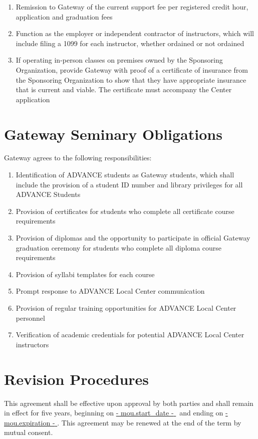 \documentclass{article}
\newcommand{\agreementstartdate}{ {{- mou.start_date -}} }
\newcommand{\agreementenddate}{ {{- mou.expiration -}} }
\begin{document}
\begin{enumerate}
    \item Remission to Gateway of the current support fee per registered credit hour, application and graduation fees
    \item Function as the employer or independent contractor of instructors, which will include filing a 1099 for each instructor, whether ordained or not ordained
    \item If operating in-person classes on premises owned by the Sponsoring Organization, provide Gateway with proof of a certificate of insurance from the Sponsoring Organization to show that they have appropriate insurance that is current and viable. The certificate must accompany the Center application
\end{enumerate}

\section*{\textbf{Gateway Seminary Obligations}}
Gateway agrees to the following responsibilities:
\begin{enumerate} \singlespacing
    \item Identification of ADVANCE students as Gateway students, which shall include the provision of a student ID number and library privileges for all ADVANCE Students
    \item Provision of certificates for students who complete all certificate course requirements
    \item Provision of diplomas and the opportunity to participate in official Gateway graduation ceremony for students who complete all diploma course requirements
    \item Provision of syllabi templates for each course
    \item Prompt response to ADVANCE Local Center communication
    \item Provision of regular training opportunities for ADVANCE Local Center personnel
    \item Verification of academic credentials for potential ADVANCE Local Center instructors
\end{enumerate}

\section*{\textbf{Revision Procedures}}
This agreement shall be effective upon approval by both parties and shall remain in effect for five years, beginning on \underline{\agreementstartdate}\ and ending on \underline{\agreementenddate}. This agreement may be renewed at the end of the term by mutual consent.
\end{document}
